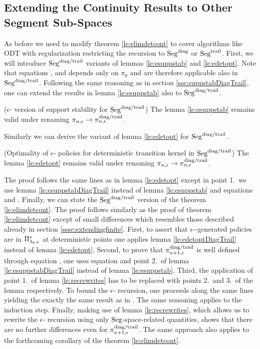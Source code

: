 \subsection{Extending the Continuity Results to Other Segment Sub-Spaces}
As before we need to modify theorem \ref{le:elimdetcont} to cover algorithms like ODT with regularization restricting the recursion to $\mathrm{Seg}^{\mathrm{diag}}$ or $\mathrm{Seg}^{\mathrm{trail}}$. First, we will introduce $\mathrm{Seg}^{\mathrm{diag}/\mathrm{trail}}$ variants of lemmas \ref{le:esuppstab} and \ref{le:edetopt}.
Note that equations ,  and 
depends only on $\pi_0$ and are therefore applicable also in $\mathrm{Seg}^{\mathrm{diag}/\mathrm{trail}}$.
Following the same reasoning as in section \ref{sse:suppstabDiagTrail},
one can extend the results in lemma \ref{le:esuppstab} also to $\mathrm{Seg}^{\mathrm{diag}/\mathrm{trail}}$.
\begin{lemma}\label{le:esuppstabDiagTrail} ($\epsilon$-\eUDRL{} version of support stability for $\mathrm{Seg}^{\mathrm{diag}/\mathrm{trail}}$) The lemma \ref{le:esuppstab} remains valid under renaming $\pi_{n,\epsilon}\rightarrow \pi_{n,\epsilon}^{\mathrm{diag}/\mathrm{trail}}$.
\end{lemma}
Similarly we can derive the variant of lemma \ref{le:edetopt} for $\mathrm{Seg}^{\mathrm{diag}/\mathrm{trail}}$.
\begin{lemma}\label{le:edetoptDiagTrail} (Optimality of $\epsilon$-\eUDRL{} policies for deterministic transition kernel in $\mathrm{Seg}^{\mathrm{diag}/\mathrm{trail}}$) The lemma \ref{le:edetopt} remains valid under renaming $\pi_{n,\epsilon}\rightarrow \pi_{n,\epsilon}^{\mathrm{diag}/\mathrm{trail}}$.
\end{lemma}
The proof follows the same lines as in lemma \ref{le:edetopt} except in point 1.\ we use lemma \ref{le:esuppstabDiagTrail} instead of lemma \ref{le:esuppstab} and equations  and . Finally, we can state the $\mathrm{Seg}^{\mathrm{diag}/\mathrm{trail}}$ version of the theorem \ref{le:elimdetcont}.
\elimdetcontDiagTrail*
The proof follows similarly as the proof of theorem \ref{le:elimdetcont} except of small differences which resembles those described already in section \ref{ssse:extendingfinite}.
First, to assert that $\epsilon$-\eUDRL{}-generated policies are in $\Pi_{\mathit{\lambda}_0,\epsilon}^*$ at deterministic points one applies lemma \ref{le:edetoptDiagTrail} instead of lemma \ref{le:edetopt}. Second, to prove that $\pi_{n+1,\epsilon}^{\mathrm{diag}/\mathrm{trail}}$ is
well defined through equation , one uses equation  and point 2.\ of lemma \ref{le:esuppstabDiagTrail} instead of lemma \ref{le:esuppstab}. Third, the application of point 1.\ of lemma \ref{le:recrewrites} has to be replaced with points 2.\ and 3.\ of the lemma respectively. To bound the $\epsilon$-\eUDRL{} recursion, one proceeds along the same lines yielding the exactly the same result as in . The same reasoning applies to the induction step. Finally, making use of lemma \ref{le:recrewrites}, which allows us to rewrite the $\epsilon$-\eUDRL{} recursion using only $\mathrm{Seg}$-space-related quantities, shows that there are no further differences even for $\pi_{n+1,\epsilon}^{\mathrm{diag}/\mathrm{trail}}$.
The same approach also applies to the forthcoming corollary of the theorem \ref{le:elimdetcont}.


